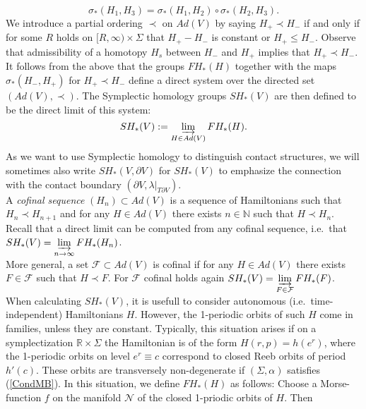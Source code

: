 \documentclass[a4paper,12pt,bibliography=totocnumbered,titlepage=false,abstracton,bookmarksnumbered=true]{scrartcl}
\theoremstyle{definition}
\begin{document}
\[\sigma_\ast(H_1,H_3)=\sigma_\ast(H_1,H_2)\circ\sigma_\ast(H_2,H_3).\]
We introduce a partial ordering $\prec$ on $Ad(V)$ by saying $H_+\prec H_-$ if and only if for some $R$ holds on $[R,\infty)\times\Sigma$ that $H_+{-}H_-$ is constant or $H_+\leq H_-$. Observe that admissibility of a homotopy $H_s$ between $H_-$ and $H_+$ implies that $H_+\prec H_-$. It follows from the above that the groups $FH_\ast(H)$ together with the maps $\sigma_\ast(H_-,H_+)$ for $H_+\prec H_-$ define a direct system over the directed set $(Ad(V),\prec)$. The Symplectic homology groups $SH_\ast(V)$ are then defined to be the direct limit of this system:
\[SH_\ast(V):=\varinjlim_{H\in Ad(V)} FH_\ast(H).\]
As we want to use Symplectic homology to distinguish contact structures, we will sometimes also write $SH_\ast(V,\partial V)$ for $SH_\ast(V)$ to emphasize the connection with the contact boundary $(\partial V,\lambda|_{T\partial V})$.\\
A \emph{cofinal sequence} $(H_n)\subset Ad(V)$ is a sequence of Hamiltonians such that $H_n\prec H_{n+1}$ and for any $H\in Ad(V)$ there exists $n\in\mathbb{N}$ such that $H\prec H_n$. Recall that a direct limit can be computed from any cofinal sequence, i.e.\ that $\displaystyle SH_\ast(V)=\varinjlim_{n\rightarrow \infty}FH_\ast(H_n)$.\\
More general, a set $\mathcal{F}\subset Ad(V)$ is cofinal if for any $H\in Ad(V)$ there exists $F\in \mathcal{F}$ such that $H\prec F$. For $\mathcal{F}$ cofinal holds again $\displaystyle SH_\ast(V)=\varinjlim_{F\in\mathcal{F}} FH_\ast(F)$.\\
When calculating $SH_\ast(V)$, it is usefull to consider autonomous (i.e.\ time-independent) Hamiltonians $H$. However, the 1-periodic orbits of such $H$ come in families, unless they are constant. Typically, this situation arises if on a symplectization $\mathbb{R}\times\Sigma$ the Hamiltonian is of the form $H(r,p)=h(e^r)$, where the 1-periodic orbits on level $e^r\equiv c$ correspond to closed Reeb orbits of period $h'(c)$. These orbits are transversely non-degenerate if $(\Sigma,\alpha)$ satisfies (\ref{CondMB}). In this situation, we define $FH_\ast(H)$ as follows: Choose a Morse-function $f$ on the manifold $\mathcal{N}$ of the closed 1-priodic orbits of $H$. Then
\end{document}

